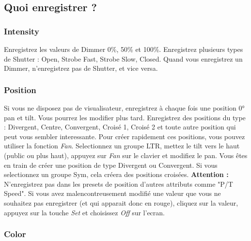 \subsection{Quoi enregistrer ?}
\label{subsec:presets_quoi}

\subsubsection{Intensity}
\label{subsubsec:presets_intensity}
Enregistrez les valeurs de Dimmer 0\%, 50\% et 100\%.
Enregistrez plusieurs types de Shutter : Open, Strobe Fast, Strobe Slow, Closed.
\newline
\newline
Quand vous enregistrez un Dimmer, n'enregistrez pas de Shutter, et vice versa.

\subsubsection{Position}
\label{subsubsec:presets_position}
Si vous ne disposez pas de visualisateur, enregistrez à chaque fois une position 0° pan et tilt. Vous pourrez les modifier plus tard.
\newline
Enregistrez des positions du type : Divergent, Centre, Convergent, Croisé 1, Croisé 2 et toute autre position qui peut vous sembler interessante.
\newline
\newline
Pour créer rapidement ces positions, vous pouvez utiliser la fonction \textit{Fan}.
Selectionnez un groupe LTR, mettez le tilt vers le haut (public ou plus haut),
appuyez sur \textit{Fan} sur le clavier et modifiez le pan. Vous êtes en train
de créer une position de type Divergent ou Convergent.
\newline
Si vous selectionnez un groupe Sym, cela créera des positions croisées.
\newline
\newline
\textbf{Attention :} N'enregistrez pas dans les presets de position d'autres attributs comme "P/T Speed".
Si vous avez malencontreusement modifié une valeur que vous ne souhaitez pas enregistrer (et qui apparait donc en rouge),
cliquez sur la valeur, appuyez sur la touche \textit{Set} et choisissez \textit{Off} sur l'ecran.

\subsubsection{Color}
\label{subsubsec:presets_color}

